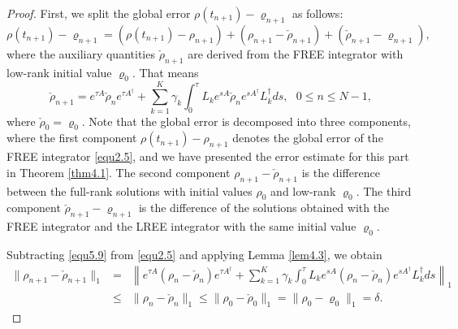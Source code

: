 \documentclass[preprint,3p,compress,12pt]{elsarticle}
\numberwithin{equation}{section}
\numberwithin{figure}{section}
\begin{document}
\begin{proof}
 First, we split the global error $\rho(t_{n+1})-\varrho_{n+1}$ as follows:
\begin{equation}\label{equ5.8}
  \rho(t_{n+1})-\varrho_{n+1}=(\rho(t_{n+1})-\rho_{n+1})+(\rho_{n+1}-\check{\rho}_{n+1})+(\check{\rho}_{n+1}-\varrho_{n+1}),
\end{equation}
where the auxiliary quantities $\check{\rho}_{n+1}$ are derived from the FREE integrator with low-rank initial value $\varrho_0$. That means
\begin{equation}\label{equ5.9}
  \check{\rho}_{n+1}=e^{\tau A}\check{\rho}_ne^{\tau A^{\dag}}+\sum_{k=1}^K\gamma_k
  \int_0^{\tau}L_ke^{sA}\check{\rho}_ne^{sA^{\dag}} L_k^{\dag}ds,~~~0\leq n\leq N-1,
\end{equation}
where $\check{\rho}_0=\varrho_0$. Note that the global error is decomposed into three components,
where the first component $\rho(t_{n+1})-\rho_{n+1}$ denotes the global error of the FREE integrator \eqref{equ2.5}, and we have presented the error estimate for this part in Theorem \ref{thm4.1}. The second component $\rho_{n+1}-\check{\rho}_{n+1}$ is the difference between the full-rank solutions with initial values $\rho_0$ and low-rank $\varrho_0$. The third component $\check{\rho}_{n+1}-\varrho_{n+1}$ is the difference of the solutions obtained with the FREE integrator and the LREE integrator with the same initial value $\varrho_0$.

Subtracting \eqref{equ5.9} from \eqref{equ2.5} and applying Lemma \ref{lem4.3}, we obtain
\begin{eqnarray}\label{equ5.10}
  \|\rho_{n+1}-\check{\rho}_{n+1}\|_1&=&\left\|e^{\tau A}(\rho_n-\check{\rho}_n)e^{\tau A^{\dag}}+\sum_{k=1}^K\gamma_k
  \int_0^{\tau}L_ke^{sA}(\rho_n-\check{\rho}_n)e^{sA^{\dag}} L_k^{\dag}ds\right\|_1\nonumber\\
  &\leq&\|\rho_n-\check{\rho}_n\|_1\leq\|\rho_0-\check{\rho}_0\|_1=\|\rho_0-\varrho_0\|_1=\delta.
\end{eqnarray}


\end{proof}
\end{document}
